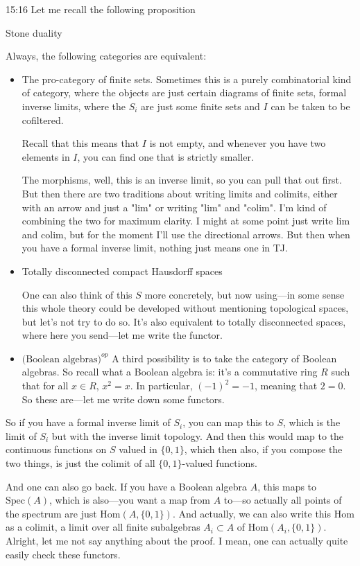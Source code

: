 \begin{unfinished}{15:16}
Let me recall the following proposition

Stone duality

Always, the following categories are equivalent: 
\begin{itemize}
\item The pro-category of finite sets. Sometimes this is a purely combinatorial kind of category, where the objects are just certain diagrams of finite sets, formal inverse limits, where the $S_i$ are just some finite sets and $I$ can be taken to be cofiltered.

Recall that this means that $I$ is not empty, and whenever you have two elements in $I$, you can find one that is strictly smaller.

The morphisms, well, this is an inverse limit, so you can pull that out first. But then there are two traditions about writing limits and colimits, either with an arrow and just a "lim" or writing "lim" and "colim". I'm kind of combining the two for maximum clarity.
% 
I might at some point just write lim and colim, but for the moment I'll use the directional arrows. But then when you have a formal inverse limit, nothing just means one in TJ.

\item Totally disconnected compact Hausdorff spaces

One can also think of this $S$ more concretely, but now using---in some sense this whole theory could be developed without mentioning topological spaces, but let's not try to do so. It's also equivalent to totally disconnected spaces, where here you send---let me write the functor.

\item $\text{(Boolean algebras)}^{op}$ A third possibility is to take the category of Boolean algebras. So recall what a Boolean algebra is: it's a commutative ring $R$ such that for all $x \in R$, $x^2 = x$. In particular, $(-1)^2 = -1$, meaning that $2 = 0$. So these are---let me write down some functors.
\end{itemize}


So if you have a formal inverse limit of $S_i$, you can map this to $S$, which is the limit of $S_i$ but with the inverse limit topology. And then this would map to the continuous functions on $S$ valued in $\{0,1\}$, which then also, if you compose the two things, is just the colimit of all $\{0,1\}$-valued functions.

And one can also go back. If you have a Boolean algebra $A$, this maps to $\mathrm{Spec}(A)$, which is also---you want a map from $A$ to---so actually all points of the spectrum are just $\mathrm{Hom}(A, \{0,1\})$. And actually, we can also write this $\mathrm{Hom}$ as a colimit, a limit over all finite subalgebras $A_i \subset A$ of $\mathrm{Hom}(A_i, \{0,1\})$. Alright, let me not say anything about the proof. I mean, one can actually quite easily check these functors.


\end{unfinished}

